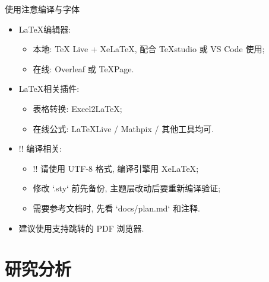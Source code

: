 \documentclass[hyperref, UTF8, CJK, aspectratio=169]{beamer}
\begin{document}
	\begin{frame}{使用注意}{编译与字体}
		\begin{itemize}
			\item<1-> \LaTeX 编辑器:
			\begin{itemize}
				\item<1-> 本地: TeX Live + XeLaTeX, 配合 TeXstudio 或 VS Code 使用;
				\item<1-> 在线: Overleaf 或 TeXPage.
			\end{itemize}
			\item<2-> \LaTeX 相关插件:
			\begin{itemize}
				\item<2-> 表格转换: Excel2\LaTeX;
				\item<2-> 在线公式: LaTeXLive / Mathpix / 其他工具均可.
			\end{itemize}
			\item<3-> \color{bita}!! 编译相关:
			\begin{itemize}
				\item<3-> \alert{!! 请使用 UTF-8 格式, 编译引擎用 XeLaTeX};
				\item<3-> 修改 `.sty` 前先备份, 主题层改动后要重新编译验证;
				\item<3-> 需要参考文档时, 先看 `docs/plan.md` 和注释.
			\end{itemize}
			\item<4-> \color{bita} 建议使用支持跳转的 PDF 浏览器.
		\end{itemize}
	\end{frame}

\section{研究分析}
\end{document}
